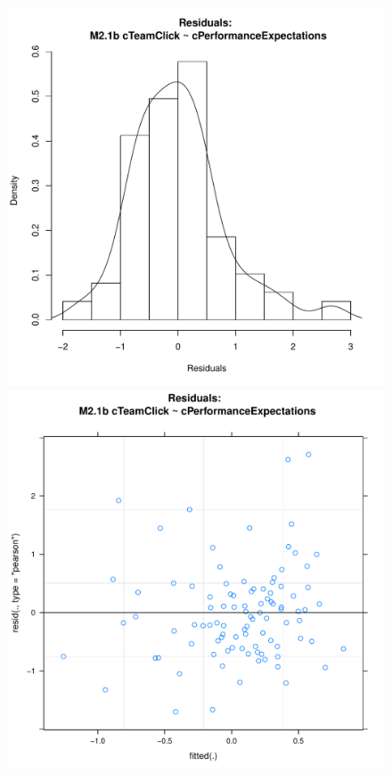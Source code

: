 {\begin{figure}[htbp]
  \includegraphics[scale =.4]{images/MLM21bHist.pdf}
  \includegraphics[scale =.4]{images/MLM21bScatter.pdf}

\end{figure}}
